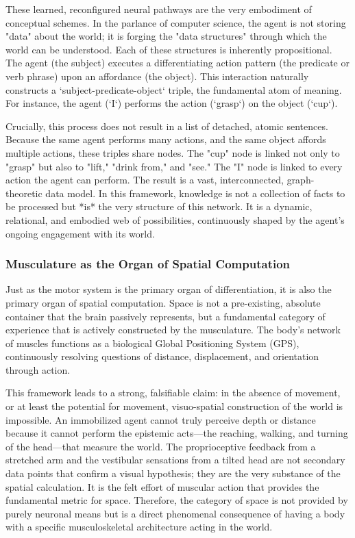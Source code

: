 These learned, reconfigured neural pathways are the very embodiment of conceptual schemes. In the parlance of computer science, the agent is not storing "data" about the world; it is forging the "data structures" through which the world can be understood. Each of these structures is inherently propositional. The agent (the subject) executes a differentiating action pattern (the predicate or verb phrase) upon an affordance (the object). This interaction naturally constructs a `subject-predicate-object` triple, the fundamental atom of meaning. For instance, the agent (`I`) performs the action (`grasp`) on the object (`cup`).

Crucially, this process does not result in a list of detached, atomic sentences. Because the same agent performs many actions, and the same object affords multiple actions, these triples share nodes. The "cup" node is linked not only to "grasp" but also to "lift," "drink from," and "see." The "I" node is linked to every action the agent can perform. The result is a vast, interconnected, graph-theoretic data model. In this framework, knowledge is not a collection of facts to be processed but *is* the very structure of this network. It is a dynamic, relational, and embodied web of possibilities, continuously shaped by the agent's ongoing engagement with its world.

\subsubsection*{Musculature as the Organ of Spatial Computation}
Just as the motor system is the primary organ of differentiation, it is also the primary organ of spatial computation. Space is not a pre-existing, absolute container that the brain passively represents, but a fundamental category of experience that is actively constructed by the musculature. The body's network of muscles functions as a biological Global Positioning System (GPS), continuously resolving questions of distance, displacement, and orientation through action.

This framework leads to a strong, falsifiable claim: in the absence of movement, or at least the potential for movement, visuo-spatial construction of the world is impossible. An immobilized agent cannot truly perceive depth or distance because it cannot perform the epistemic acts—the reaching, walking, and turning of the head—that measure the world. The proprioceptive feedback from a stretched arm and the vestibular sensations from a tilted head are not secondary data points that confirm a visual hypothesis; they are the very substance of the spatial calculation. It is the felt effort of muscular action that provides the fundamental metric for space. Therefore, the category of space is not provided by purely neuronal means but is a direct phenomenal consequence of having a body with a specific musculoskeletal architecture acting in the world.

